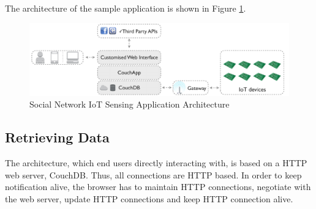 The architecture of the sample application is shown in Figure \ref{fig:data-centre-architecture}.

\begin{figure}[t]
  \begin{center}
    \includegraphics[width=1\textwidth]{images/data-centre-architecture.pdf}
    \caption{Social Network IoT Sensing Application Architecture \cite{francesco2012storage}}
    \label{fig:data-centre-architecture}
  \end{center}
\end{figure}

\subsection{Retrieving Data}
The architecture, which end users directly interacting with, is based on a HTTP web server, CouchDB. Thus, all connections are HTTP based. In order to keep notification alive, the browser has to maintain HTTP connections, negotiate with the web server, update HTTP connections and keep HTTP connection alive. 


 